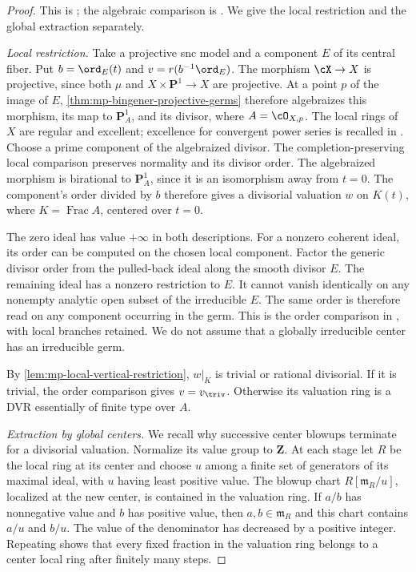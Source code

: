 \begin{proof}
This is \cite[Theorem~2.5.5]{MPTropicalV2}; the algebraic
comparison is \cite[Theorem~4.6]{BHJ17}. We give the local
restriction and the global extraction separately.

\emph{Local restriction.}
Take a projective snc model and a component $E$ of its central
fiber. Put $b=\ord_E(t)$ and $v=r(b^{-1}\ord_E)$.
The morphism $\cX\to X$ is projective, since both $\mu$ and
$X\times\mathbf P^1\to X$ are projective. At a point $p$ of
the image of $E$, \cref{thm:mp-bingener-projective-germs}
therefore algebraizes this morphism, its map to
$\mathbf P^1_A$, and its divisor, where $A=\cO_{X,p}$.
The local rings of $X$ are regular and excellent; excellence
for convergent power series is recalled in \cite[Section~1.1]{JM12}.
Choose a prime component of the algebraized divisor. The
completion-preserving local comparison preserves normality and
its divisor order. The algebraized morphism is birational to
$\mathbf P^1_A$, since it is an isomorphism away from $t=0$.
The component's order divided by $b$ therefore gives a
divisorial valuation $w$ on $K(t)$, where
$K=\operatorname{Frac}A$, centered over $t=0$.

The zero ideal has value $+\infty$ in both descriptions. For a
nonzero coherent ideal, its order can be computed on the chosen
local component. Factor the generic divisor order from the
pulled-back ideal along the smooth divisor $E$. The remaining
ideal has a nonzero restriction to $E$. It cannot vanish
identically on any nonempty analytic open subset of the
irreducible $E$. The same order is therefore read on any
component occurring in the germ. This is the order comparison
in \cite[Proposition~2.5.10]{MPTropicalV2}, with local branches
retained. We do not assume that a globally irreducible center
has an irreducible germ.

By \cref{lem:mp-local-vertical-restriction}, $w|_K$ is trivial
or rational divisorial. If it is trivial, the order comparison
gives $v=v_{\triv}$. Otherwise its valuation ring is a DVR
essentially of finite type over $A$.

\emph{Extraction by global centers.}
We recall why successive center blowups terminate for a
divisorial valuation. Normalize its value group to $\mathbf Z$.
At each stage let $R$ be the local ring at its center and choose
$u$ among a finite set of generators of its maximal ideal,
with $u$ having least positive value.
The blowup chart $R[\mathfrak m_R/u]$, localized at the new
center, is contained in the valuation ring. If $a/b$ has
nonnegative value and $b$ has positive value, then $a,b\in
\mathfrak m_R$ and this chart contains $a/u$ and $b/u$.
The value of the denominator has decreased by a positive integer.
Repeating shows that every fixed fraction in the valuation ring
belongs to a center local ring after finitely many steps.


\end{proof}
